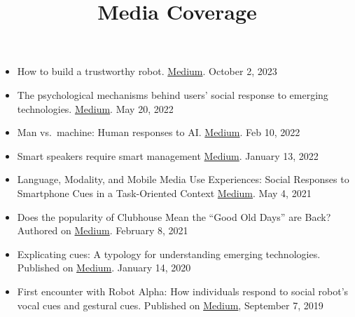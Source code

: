 \documentclass[]{article}
\title{Media Coverage}
\author{}
\date{\vspace{-2.5em}}
\begin{document}
\maketitle

\begin{itemize}
\item
  How to build a trustworthy robot.
  \href{https://medium.com/university-of-florida-college-of-journalism-and/how-to-build-a-trustworthy-robot-bed1de61cd1f}{Medium}.
  October 2, 2023
\item
  The psychological mechanisms behind users' social response to emerging
  technologies.
  \href{https://medium.com/university-of-florida-college-of-journalism-and/the-psychological-mechanisms-behind-users-social-response-to-emerging-technologies-5e3fd54ca5f7}{Medium}.
  May 20, 2022
\item
  Man vs.~machine: Human responses to AI.
  \href{https://medium.com/university-of-florida-college-of-journalism-and/man-vs-machine-human-responses-to-ai-7cc8d9c3251c}{Medium}.
  Feb 10, 2022
\item
  Smart speakers require smart management
  \href{https://medium.com/university-of-florida-college-of-journalism-and/smart-speakers-require-smart-management-b447160dd6b5}{Medium}.
  January 13, 2022
\item
  Language, Modality, and Mobile Media Use Experiences: Social Responses
  to Smartphone Cues in a Task-Oriented Context
  \href{https://medium.com/university-of-florida-college-of-journalism-and/language-modality-and-mobile-media-use-experiences-social-responses-to-smartphone-cues-in-a-7fa7e07376e6}{Medium}.
  May 4, 2021
\item
  Does the popularity of Clubhouse Mean the ``Good Old Days'' are Back?
  Authored on
  \href{https://medium.com/university-of-florida-college-of-journalism-and/does-the-popularity-of-clubhouse-mean-the-good-old-days-are-back-69a863a3918e}{Medium}.
  February 8, 2021
\item
  Explicating cues: A typology for understanding emerging technologies.
  Published on
  \href{https://medium.com/university-of-florida-college-of-journalism-and/explicating-cues-a-typology-for-understanding-emerging-media-technologies-c76509e428a8}{Medium}.
  January 14, 2020
\item
  First encounter with Robot Alpha: How individuals respond to social
  robot's vocal cues and gestural cues. Published on
  \href{https://medium.com/university-of-florida-college-of-journalism-and/first-encounter-with-robot-alpha-how-individuals-respond-to-social-robots-vocal-cues-and-gestures-1395c8bb506d}{Medium},
  September 7, 2019
\end{itemize}
\end{document}
